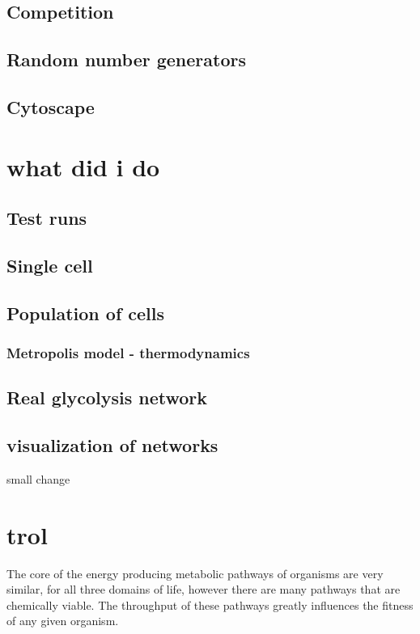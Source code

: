\documentclass[10pt,a4paper]{article}
\begin{document}
	\subsection{Competition}
	
		
		\subsection{Random number generators}
		\subsection{Cytoscape}

	

	\section{what did i do}
	\subsection{Test runs}
	\subsection{Single cell}
	\subsection{Population of cells}
	\subsubsection{Metropolis model - thermodynamics}
	\subsection{Real glycolysis network}
	\subsection{visualization of networks}

	small change
	\iffalse
	
	\section{trol}
	The core of the energy producing metabolic pathways of organisms are very similar, for all three domains of life, however there are many pathways that are chemically viable.  The throughput of these pathways greatly influences the fitness of any given organism. 
	
\end{document}
